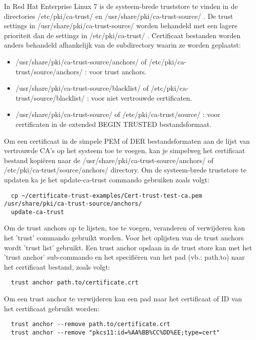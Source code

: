 In Red Hat Enterprise Linux 7 is de systeem-brede truststore te vinden in de directories /etc/pki/ca-trust/ en /usr/share/pki/ca-trust-source/ . De trust settings in /usr/share/pki/ca-trust-source/ worden behandeld met een lagere prioriteit dan de settings in /etc/pki/ca-trust/ .
Certificaat bestanden worden anders behandeld afhankelijk van de subdirectory waarin ze worden geplaatst:
\begin{itemize}
  \item /usr/share/pki/ca-trust-source/anchors/ of /etc/pki/ca-trust/source/anchors/ : voor trust anchors.
  \item /usr/share/pki/ca-trust-source/blacklist/ of /etc/pki/ca-trust/source/blacklist/ : voor niet vertrouwde certificaten.
  \item /usr/share/pki/ca-trust-source/ of /etc/pki/ca-trust/source/ : voor certificaten in de extended BEGIN TRUSTED bestandsformaat.
\end{itemize} \autocite{RHELtruststore}

Om een certificaat in de simpele PEM of DER bestandsformaten aan de lijst van vertrouwde CA's op het systeem toe te voegen, kan je simpelweg het certificaat bestand kopiëren naar de /usr/share/pki/ca-trust-source/anchors/ of /etc/pki/ca-trust/source/anchors/ directory. Om de systeem-brede truststore te updaten ka je het update-ca-trust commando gebruiken zoals volgt:
\begin{verbatim}
  cp ~/certificate-trust-examples/Cert-trust-test-ca.pem /usr/share/pki/ca-trust-source/anchors/
  update-ca-trust
\end{verbatim} 

Om de trust anchors op te lijsten, toe te voegen, veranderen of verwijderen kan het 'trust' commando gebruikt worden.
Voor het oplijsten van de trust anchors wordt 'trust list' gebruikt.
Een trust anchor opslaan in de trust store kan met het 'trust anchor' sub-commando en het specifiëren van het pad (vb.: path.to) naar het certificaat bestand, zoals volgt:
\begin{verbatim}
  trust anchor path.to/certificate.crt
\end{verbatim} 
Om een trust anchor te verwijderen kan een pad naar het certificaat of ID van het certificaat gebruikt worden:
\begin{verbatim}
  trust anchor --remove path.to/certificate.crt
  trust anchor --remove "pkcs11:id=%AA%BB%CC%DD%EE;type=cert"
\end{verbatim} 
\autocite{RHELtruststore} \break

